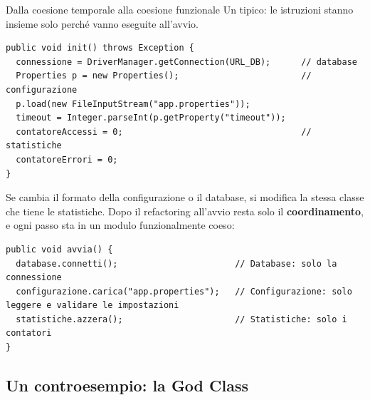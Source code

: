 
\begin{esempio}{Dalla coesione temporale alla coesione funzionale}
Un  tipico: le istruzioni stanno insieme solo perché vanno eseguite all'avvio.
\begin{lstlisting}[style=java, name=Applicazione.java]
public void init() throws Exception {
  connessione = DriverManager.getConnection(URL_DB);      // database
  Properties p = new Properties();                        // configurazione
  p.load(new FileInputStream("app.properties"));
  timeout = Integer.parseInt(p.getProperty("timeout"));
  contatoreAccessi = 0;                                   // statistiche
  contatoreErrori = 0;
}
\end{lstlisting}
Se cambia il formato della configurazione o il database, si modifica la stessa classe che tiene le statistiche. Dopo il
refactoring all'avvio resta solo il \textbf{coordinamento}, e ogni passo sta in un modulo funzionalmente coeso:
\begin{lstlisting}[style=java, name=Applicazione.java]
public void avvia() {
  database.connetti();                       // Database: solo la connessione
  configurazione.carica("app.properties");   // Configurazione: solo leggere e validare le impostazioni
  statistiche.azzera();                      // Statistiche: solo i contatori
}
\end{lstlisting}
\end{esempio}

\subsection{Un controesempio: la God Class}



